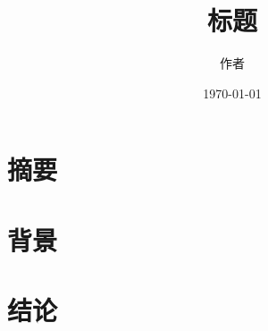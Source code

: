 \documentclass[twocolumn]{article}
\title{标题}
\author{作者}
\date{\today}
\begin{document}
\maketitle

\section*{摘要}
\section{背景}
\section{结论}

\end{document}
